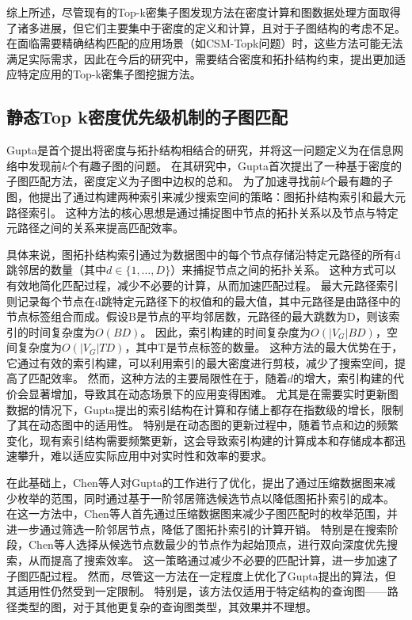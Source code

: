 综上所述，尽管现有的Top-k密集子图发现方法在密度计算和图数据处理方面取得了诸多进展，但它们主要集中于密度的定义和计算，且对于子图结构的考虑不足。在面临需要精确结构匹配的应用场景（如CSM-Topk问题）时，这些方法可能无法满足实际需求，因此在今后的研究中，需要结合密度和拓扑结构约束，提出更加适应特定应用的Top-k密集子图挖掘方法。

\subsection{静态Top k密度优先级机制的子图匹配}
Gupta\cite{static-topk-Gupta-DBLP:conf/icde/GuptaGYCH14}是首个提出将密度与拓扑结构相结合的研究，并将这一问题定义为在信息网络中发现前$k$个有趣子图的问题。
在其研究中，Gupta首次提出了一种基于密度的子图匹配方法，密度定义为子图中边权的总和。
为了加速寻找前$k$个最有趣的子图，他提出了通过构建两种索引来减少搜索空间的策略：图拓扑结构索引和最大元路径索引。
这种方法的核心思想是通过捕捉图中节点的拓扑关系以及节点与特定元路径之间的关系来提高匹配效率。

具体来说，图拓扑结构索引通过为数据图中的每个节点存储沿特定元路径的所有d跳邻居的数量（其中$d \in \{1,\dots,D\}$）来捕捉节点之间的拓扑关系。
这种方式可以有效地简化匹配过程，减少不必要的计算，从而加速匹配过程。
最大元路径索引则记录每个节点在d跳特定元路径下的权值和的最大值，其中元路径是由路径中的节点标签组合而成。假设B是节点的平均邻居数，元路径的最大跳数为D，则该索引的时间复杂度为$O(BD)$。
因此，索引构建的时间复杂度为$O(|V_G|BD)$，空间复杂度为$O(|V_G|TD)$，其中T是节点标签的数量。
这种方法的最大优势在于，它通过有效的索引构建，可以利用索引的最大密度进行剪枝，减少了搜索空间，提高了匹配效率。
然而，这种方法的主要局限性在于，随着$d$的增大，索引构建的代价会显著增加，导致其在动态场景下的应用变得困难。
尤其是在需要实时更新图数据的情况下，Gupta提出的索引结构在计算和存储上都存在指数级的增长，限制了其在动态图中的适用性。
特别是在动态图的更新过程中，随着节点和边的频繁变化，现有索引结构需要频繁更新，这会导致索引构建的计算成本和存储成本都迅速攀升，难以适应实际应用中对实时性和效率的要求。


在此基础上，Chen\cite{static-topk-Chen-DBLP:journals/ijprai/ChenLCTL18}等人对Gupta的工作进行了优化，提出了通过压缩数据图来减少枚举的范围，同时通过基于一阶邻居筛选候选节点以降低图拓扑索引的成本。
在这一方法中，Chen等人首先通过压缩数据图来减少子图匹配时的枚举范围，并进一步通过筛选一阶邻居节点，降低了图拓扑索引的计算开销。
特别是在搜索阶段，Chen\cite{static-topk-Chen-DBLP:journals/ijprai/ChenLCTL18}等人选择从候选节点数最少的节点作为起始顶点，进行双向深度优先搜索，从而提高了搜索效率。
这一策略通过减少不必要的匹配计算，进一步加速了子图匹配过程。
然而，尽管这一方法在一定程度上优化了Gupta提出的算法，但其适用性仍然受到一定限制。
特别是，该方法仅适用于特定结构的查询图——路径类型的图，对于其他更复杂的查询图类型，其效果并不理想。

